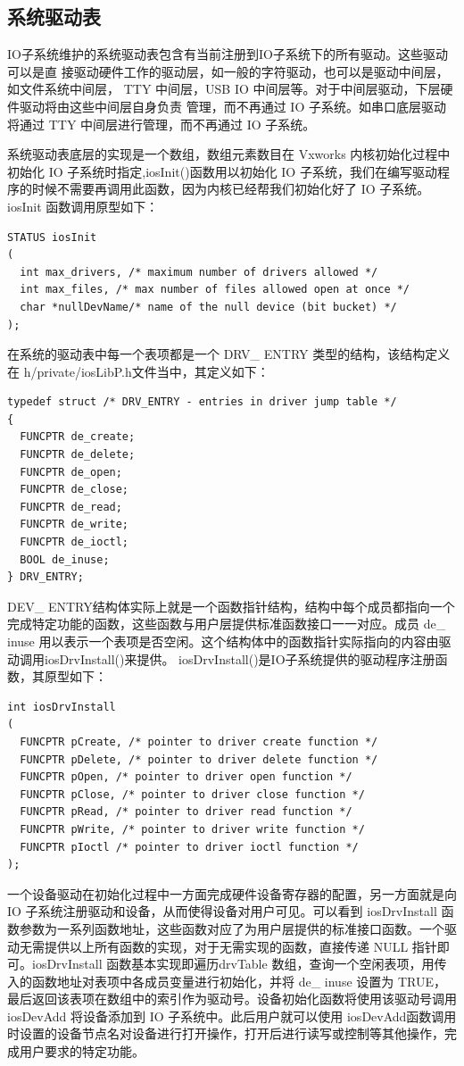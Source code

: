 \subsection{系统驱动表}
	IO子系统维护的系统驱动表包含有当前注册到IO子系统下的所有驱动。这些驱动可以是直
接驱动硬件工作的驱动层，如一般的字符驱动，也可以是驱动中间层，如文件系统中间层，
TTY 中间层，USB IO 中间层等。对于中间层驱动，下层硬件驱动将由这些中间层自身负责
管理，而不再通过 IO 子系统。如串口底层驱动将通过 TTY 中间层进行管理，而不再通过
IO 子系统。

	系统驱动表底层的实现是一个数组，数组元素数目在 Vxworks 内核初始化过程中初始化 IO 子系统时指定,iosInit()函数用以初始化 IO 子系统，我们在编写驱动程序的时候不需要再调用此函数，因为内核已经帮我们初始化好了 IO 子系统。iosInit 函数调用原型如下：
\lstset{language=C}
\begin{lstlisting}
STATUS iosInit 
( 
  int max_drivers, /* maximum number of drivers allowed */ 
  int max_files, /* max number of files allowed open at once */ 
  char *nullDevName/* name of the null device (bit bucket) */ 
); 
\end{lstlisting}

在系统的驱动表中每一个表项都是一个 DRV\_ ENTRY 类型的结构，该结构定义在 h/private/iosLibP.h文件当中，其定义如下：
\lstset{language=C}
\begin{lstlisting}
typedef struct /* DRV_ENTRY - entries in driver jump table */ 
{ 
  FUNCPTR de_create; 
  FUNCPTR de_delete; 
  FUNCPTR de_open; 
  FUNCPTR de_close; 
  FUNCPTR de_read; 
  FUNCPTR de_write; 
  FUNCPTR de_ioctl; 
  BOOL de_inuse; 
} DRV_ENTRY; 
\end{lstlisting}
DEV\_ ENTRY结构体实际上就是一个函数指针结构，结构中每个成员都指向一个完成特定功能的函数，这些函数与用户层提供标准函数接口一一对应。成员 de\_ inuse 用以表示一个表项是否空闲。这个结构体中的函数指针实际指向的内容由驱动调用iosDrvInstall()来提供。 iosDrvInstall()是IO子系统提供的驱动程序注册函数，其原型如下：
\lstset{language=C}
\begin{lstlisting}
int iosDrvInstall 
( 
  FUNCPTR pCreate, /* pointer to driver create function */ 
  FUNCPTR pDelete, /* pointer to driver delete function */ 
  FUNCPTR pOpen, /* pointer to driver open function */ 
  FUNCPTR pClose, /* pointer to driver close function */ 
  FUNCPTR pRead, /* pointer to driver read function */ 
  FUNCPTR pWrite, /* pointer to driver write function */ 
  FUNCPTR pIoctl /* pointer to driver ioctl function */ 
); 
\end{lstlisting}
一个设备驱动在初始化过程中一方面完成硬件设备寄存器的配置，另一方面就是向 IO 子系统注册驱动和设备，从而使得设备对用户可见。可以看到 iosDrvInstall 函数参数为一系列函数地址，这些函数对应了为用户层提供的标准接口函数。一个驱动无需提供以上所有函数的实现，对于无需实现的函数，直接传递 NULL 指针即可。iosDrvInstall 函数基本实现即遍历drvTable 数组，查询一个空闲表项，用传入的函数地址对表项中各成员变量进行初始化，并将 de\_ inuse 设置为 TRUE，最后返回该表项在数组中的索引作为驱动号。设备初始化函数将使用该驱动号调用 iosDevAdd 将设备添加到 IO 子系统中。此后用户就可以使用 iosDevAdd函数调用时设置的设备节点名对设备进行打开操作，打开后进行读写或控制等其他操作，完成用户要求的特定功能。

